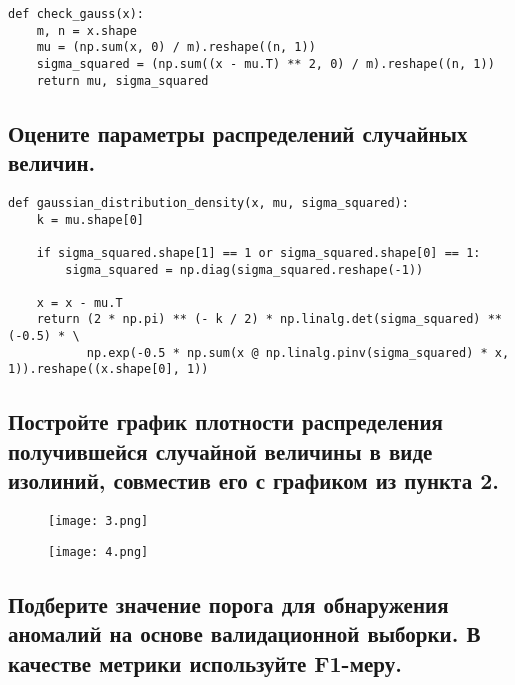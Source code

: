 \begin{lstlisting}
def check_gauss(x):
    m, n = x.shape
    mu = (np.sum(x, 0) / m).reshape((n, 1))
    sigma_squared = (np.sum((x - mu.T) ** 2, 0) / m).reshape((n, 1))
    return mu, sigma_squared
\end{lstlisting}

\subsection{Оцените параметры распределений случайных величин.}

\begin{lstlisting}
def gaussian_distribution_density(x, mu, sigma_squared):
    k = mu.shape[0]

    if sigma_squared.shape[1] == 1 or sigma_squared.shape[0] == 1:
        sigma_squared = np.diag(sigma_squared.reshape(-1))

    x = x - mu.T
    return (2 * np.pi) ** (- k / 2) * np.linalg.det(sigma_squared) ** (-0.5) * \
           np.exp(-0.5 * np.sum(x @ np.linalg.pinv(sigma_squared) * x, 1)).reshape((x.shape[0], 1))
\end{lstlisting}

\subsection{Постройте график плотности распределения получившейся случайной величины в виде изолиний, совместив его с графиком из пункта 2.}

\begin{figure}[h]
\centering
    \texttt{[image: 3.png]}
  \label{sec:purpose:payings}
\end{figure}

\begin{figure}[h]
\centering
    \texttt{[image: 4.png]}
  \label{sec:purpose:payings}
\end{figure}

\subsection{Подберите значение порога для обнаружения аномалий на основе валидационной выборки. В качестве метрики используйте F1-меру.}

